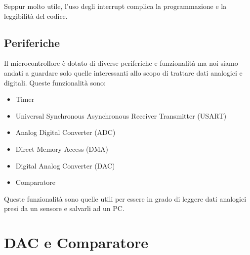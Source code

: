 Seppur molto utile, l'uso degli interrupt complica la programmazione e la leggibilità del codice.


\subsection{Periferiche}

Il microcontrollore è dotato di diverse periferiche e funzionalità ma noi siamo andati a guardare solo quelle interessanti allo scopo di trattare dati analogici e digitali. Queste funzionalità sono:
\begin{itemize}
    \item Timer
    \item Universal Synchronous Asynchronous Receiver Transmitter (USART)
    \item Analog Digital Converter (ADC)
    \item Direct Memory Access (DMA)
    \item Digital Analog Converter (DAC)
    \item Comparatore
\end{itemize}
Queste funzionalità sono quelle utili per essere in grado di leggere dati analogici presi da un sensore e salvarli ad un PC.













\section{DAC e Comparatore}